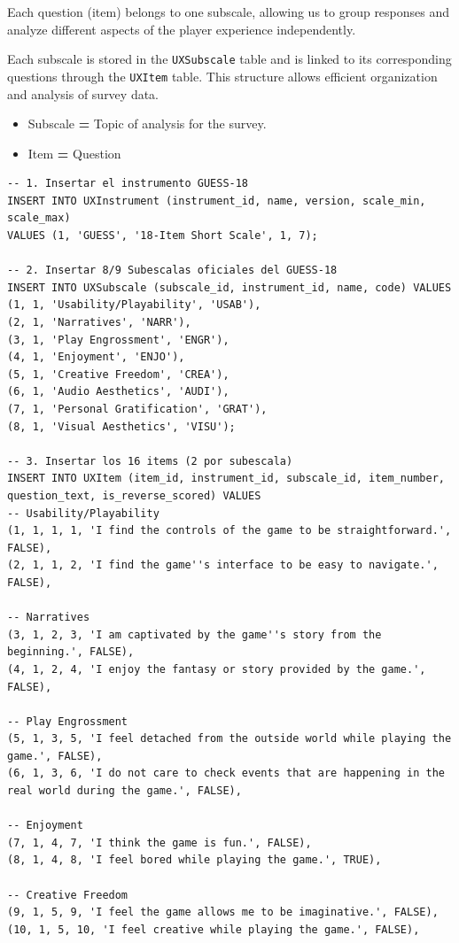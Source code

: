 \documentclass[11pt]{article}
\begin{document}
Each question (item) belongs to one subscale, allowing us to group responses and analyze different aspects of the player experience independently.

Each subscale is stored in the \texttt{UXSubscale} table and is linked to its corresponding questions through the \texttt{UXItem} table. This structure allows efficient organization and analysis of survey data.

\begin{itemize}
    \item Subscale \textbf{=} Topic of analysis for the survey.
    \item Item \textbf{=} Question
\end{itemize}

\clearpage
\begin{lstlisting}[style=sqlstyle]
-- 1. Insertar el instrumento GUESS-18
INSERT INTO UXInstrument (instrument_id, name, version, scale_min, scale_max) 
VALUES (1, 'GUESS', '18-Item Short Scale', 1, 7);
 
-- 2. Insertar 8/9 Subescalas oficiales del GUESS-18
INSERT INTO UXSubscale (subscale_id, instrument_id, name, code) VALUES 
(1, 1, 'Usability/Playability', 'USAB'),
(2, 1, 'Narratives', 'NARR'),
(3, 1, 'Play Engrossment', 'ENGR'),
(4, 1, 'Enjoyment', 'ENJO'),
(5, 1, 'Creative Freedom', 'CREA'),
(6, 1, 'Audio Aesthetics', 'AUDI'),
(7, 1, 'Personal Gratification', 'GRAT'),
(8, 1, 'Visual Aesthetics', 'VISU');
 
-- 3. Insertar los 16 items (2 por subescala)
INSERT INTO UXItem (item_id, instrument_id, subscale_id, item_number, question_text, is_reverse_scored) VALUES 
-- Usability/Playability
(1, 1, 1, 1, 'I find the controls of the game to be straightforward.', FALSE),
(2, 1, 1, 2, 'I find the game''s interface to be easy to navigate.', FALSE),
 
-- Narratives
(3, 1, 2, 3, 'I am captivated by the game''s story from the beginning.', FALSE),
(4, 1, 2, 4, 'I enjoy the fantasy or story provided by the game.', FALSE),
 
-- Play Engrossment
(5, 1, 3, 5, 'I feel detached from the outside world while playing the game.', FALSE),
(6, 1, 3, 6, 'I do not care to check events that are happening in the real world during the game.', FALSE),
 
-- Enjoyment
(7, 1, 4, 7, 'I think the game is fun.', FALSE),
(8, 1, 4, 8, 'I feel bored while playing the game.', TRUE),
 
-- Creative Freedom
(9, 1, 5, 9, 'I feel the game allows me to be imaginative.', FALSE),
(10, 1, 5, 10, 'I feel creative while playing the game.', FALSE),
 

\end{lstlisting}
\end{document}
